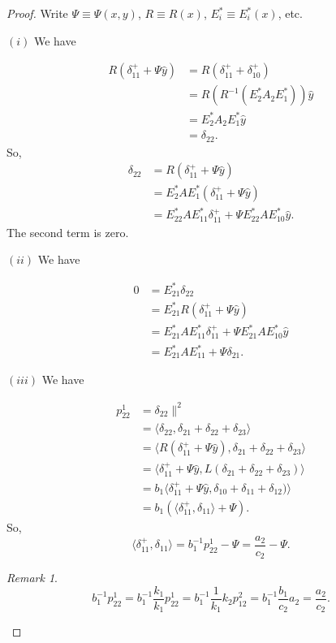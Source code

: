 \documentclass[
]{book}
\theoremstyle{definition}
\theoremstyle{definition}
\theoremstyle{definition}
\theoremstyle{definition}
\theoremstyle{remark}
\newtheorem*{remark}{Remark}
\begin{document}
\begin{proof}

Write \(\Psi \equiv \Psi(x,y)\), \(R \equiv R(x)\), \(E^*_i \equiv E^*_i(x)\), etc.

\((i)\) We have

\begin{align}
R(\delta^+_{11} + \Psi \hat{y}) & = R(\delta^+_{11} + \delta^+_{10})\\
& = R(R^{-1}(E^*_2A_2E^*_1))\hat{y}\\
& = E^*_2A_2E^*_1\hat{y}\\
& = \delta_{22}.
\end{align}
So,
\begin{align}
\delta_{22} & = R(\delta^+_{11} + \Psi \hat{y})\\
& = E^*_2AE^*_1(\delta^+_{11} + \Psi \hat{y})\\
& = E^*_{22}AE^*_{11}\delta^+_{11} + \Psi E^*_{22}A E^*_{10}\hat{y}.
\end{align}
The second term is zero.

\((ii)\) We have

\begin{align}
0 & = E^*_{21}\delta_{22}\\
& = E^*_{21}R(\delta^+_{11} + \Psi \hat{y})\\
& = E^*_{21}AE^*_{11}\delta^+_{11} + \Psi E^*_{21}AE^*_{10}\hat{y}\\
& = E^*_{21}AE^*_{11} + \Psi \delta_{21}.
\end{align}

\((iii)\) We have

\begin{align}
p^{1}_{22} & = \delta_{22}\|^2 \\
& = \langle \delta_{22}, \delta_{21}+\delta_{22}+\delta_{23}\rangle\\
& = \langle R(\delta^+_{11} + \Psi \hat{y}), \delta_{21}+\delta_{22}+\delta_{23}\rangle\\
& = \langle \delta^+_{11} + \Psi \hat{y}, L(\delta_{21}+\delta_{22}+\delta_{23})\rangle\\
& = b_1\langle \delta^+_{11} + \Psi \hat{y}, \delta_{10}+\delta_{11}+\delta_{12})\rangle\\
& = b_1(\langle \delta^+_{11}, \delta_{11}\rangle + \Psi).
\end{align}
So,
\[\langle \delta^+_{11}, \delta_{11}\rangle = b_1^{-1}p^{1}_{22}- \Psi = \frac{a_2}{c_2}-\Psi.\]

\begin{remark}
\[b^{-1}_1p^1_{22} = b^{-1}_1\frac{k_1}{k_1}p^1_{22} = b^{-1}_1\frac{1}{k_1}k_2p^{2}_{12} = b^{-1}_1\frac{b_1}{c_2}a_2 = \frac{a_2}{c_2}.\]
\end{remark}


\end{proof}
\end{document}
